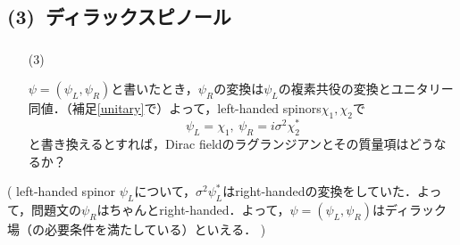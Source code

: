 \documentclass[pdflatex,unicode,ja=standard,12pt]{beamer}
\begin{document}
\subsection{(3)\ ディラックスピノール}

\begin{frame}

  \frametitle{\subsecname}

  \begin{itemize}

    \item [(3)]
    
    $\psi=(\psi_{L},\psi_{R})$と書いたとき，$\psi_{R}$の変換は$\psi_{L}$の複素共役の変換とユニタリー同値．（補足\ref{unitary}で）よって，left-handed spinors$\chi_1,\chi_2$で
    \begin{equation}
      \psi_L=\chi_1
      ,\ 
      \psi_R=i\sigma^2\chi_2^{*}
    \end{equation}
    と書き換えるとすれば，Dirac fieldのラグランジアンとその質量項はどうなるか？

  \end{itemize}

  \vspace{10pt}

  (
    left-handed spinor $\psi_L$について，$\sigma^2\psi_{L}^{*}$はright-handedの変換をしていた．よって，問題文の$\psi_{R}$はちゃんとright-handed．よって，$\psi=(\psi_L,\psi_R)$はディラック場（の必要条件を満たしている）といえる．
  )
  
\end{frame}
\end{document}
